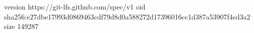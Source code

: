 version https://git-lfs.github.com/spec/v1
oid sha256:e27dbe17993d0869463cdf79d8d0a588272d17396016cc1d387a53907f4ed3a2
size 149287
